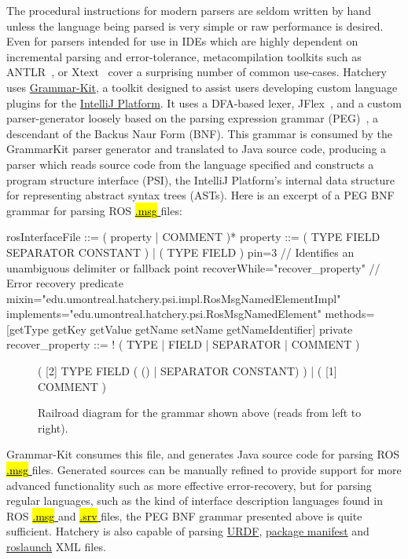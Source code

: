 \documentclass[12pt,initial,twoside,maitrise]{dms}
\newcommand{\inline}[1]{%
\begingroup%
\sethlcolor{slightgray}%
\hl{\ttfamily\small #1}%
\endgroup
}
\numberwithin{equation}{section}
\numberwithin{table}{chapter}
\numberwithin{figure}{chapter}
\begin{document}
The procedural instructions for modern parsers are seldom written by hand unless the language being parsed is very simple or raw performance is desired. Even for parsers intended for use in IDEs which are highly dependent on incremental parsing and error-tolerance, metacompilation toolkits such as ANTLR~\citep{parr1995antlr}, or Xtext~\citep{eysholdt2010xtext} cover a surprising number of common use-cases. Hatchery uses \href{https://github.com/JetBrains/grammar-kit}{Grammar-Kit}, a toolkit designed to assist users developing custom language plugins for the \href{http://www.jetbrains.org/intellij/sdk/docs/welcome.html}{IntelliJ Platform}. It uses a DFA-based lexer, JFlex~\citep{klein2001jflex}, and a custom parser-generator loosely based on the parsing expression grammar (PEG)~\citep{ford2004parsing}, a descendant of the Backus Naur Form (BNF). This grammar is consumed by the GrammarKit parser generator and translated to Java source code, producing a parser which reads source code from the language specified and constructs a program structure interface (PSI), the IntelliJ Platform's internal data structure for representing abstract syntax trees (ASTs). Here is an excerpt of a PEG BNF grammar for parsing ROS \href{http://wiki.ros.org/msg}{\inline{.msg}} files:
%
\begin{bnflisting}
rosInterfaceFile ::= ( property | COMMENT )*
property ::= ( TYPE FIELD SEPARATOR CONSTANT ) | ( TYPE FIELD ) {
    pin=3 // Identifies an unambiguous delimiter or fallback point
    recoverWhile="recover_property" // Error recovery predicate
    mixin="edu.umontreal.hatchery.psi.impl.RosMsgNamedElementImpl"
    implements="edu.umontreal.hatchery.psi.RosMsgNamedElement"
    methods=[getType getKey getValue getName setName getNameIdentifier]
}
private recover_property ::= ! ( TYPE | FIELD | SEPARATOR | COMMENT )
\end{bnflisting}
%
\begin{figure}
\centering
\begin{rail}
( [2] TYPE FIELD ( () | SEPARATOR CONSTANT) ) | ( [1] COMMENT )
\end{rail}
\caption{Railroad diagram for the grammar shown above (reads from left to right).}
\label{fig:railroad}
\end{figure}
%
Grammar-Kit consumes this file, and generates Java source code for parsing ROS \href{http://wiki.ros.org/msg}{\inline{.msg}} files. Generated sources can be manually refined to provide support for more advanced functionality such as more effective error-recovery, but for parsing regular languages, such as the kind of interface description languages found in ROS \href{http://wiki.ros.org/msg}{\inline{.msg}} and \href{http://wiki.ros.org/srv}{\inline{.srv}} files, the PEG BNF grammar presented above is quite sufficient. Hatchery is also capable of parsing \href{http://wiki.ros.org/urdf}{URDF}, \href{http://wiki.ros.org/Manifest}{package manifest} and \href{http://wiki.ros.org/roslaunch/XML}{roslaunch} XML files.
\end{document}
